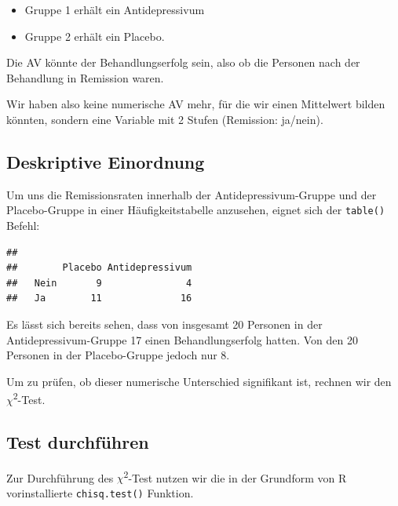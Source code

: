 \documentclass[
]{book}
\newenvironment{Shaded}{\begin{snugshade}}{\end{snugshade}}
\newcommand{\FunctionTok}[1]{\textcolor[rgb]{0.00,0.00,0.00}{#1}}
\newcommand{\NormalTok}[1]{#1}
\newcommand{\SpecialCharTok}[1]{\textcolor[rgb]{0.00,0.00,0.00}{#1}}
\providecommand{\tightlist}{%
  \setlength{\itemsep}{0pt}\setlength{\parskip}{0pt}}
\begin{document}
\begin{itemize}
\tightlist
\item
  Gruppe 1 erhält ein Antidepressivum
\item
  Gruppe 2 erhält ein Placebo.
\end{itemize}

Die AV könnte der Behandlungserfolg sein, also ob die Personen nach der Behandlung in Remission waren.

Wir haben also keine numerische AV mehr, für die wir einen Mittelwert bilden könnten, sondern eine Variable mit 2 Stufen (Remission: ja/nein).

\hypertarget{deskriptive-einordnung-3}{%
\subsection{Deskriptive Einordnung}\label{deskriptive-einordnung-3}}

Um uns die Remissionsraten innerhalb der Antidepressivum-Gruppe und der Placebo-Gruppe in einer Häufigkeitstabelle anzusehen, eignet sich der \texttt{table()} Befehl:

\begin{Shaded}
\end{Shaded}

\begin{verbatim}
##       
##        Placebo Antidepressivum
##   Nein       9               4
##   Ja        11              16
\end{verbatim}

Es lässt sich bereits sehen, dass von insgesamt 20 Personen in der Antidepressivum-Gruppe 17 einen Behandlungserfolg hatten. Von den 20 Personen in der Placebo-Gruppe jedoch nur 8.

Um zu prüfen, ob dieser numerische Unterschied signifikant ist, rechnen wir den \(\chi\)\textsuperscript{2}-Test.

\hypertarget{test-durchfuxfchren-5}{%
\subsection{Test durchführen}\label{test-durchfuxfchren-5}}

Zur Durchführung des \(\chi\)\textsuperscript{2}-Test nutzen wir die in der Grundform von R vorinstallierte \texttt{chisq.test()} Funktion.
\end{document}
